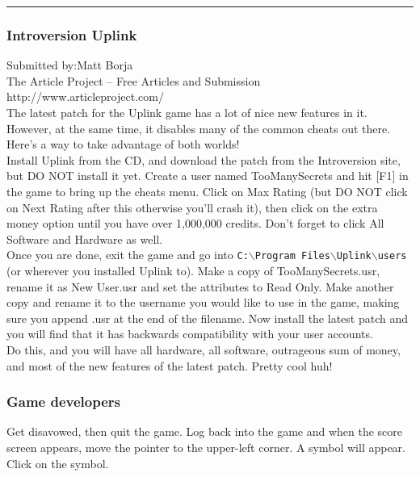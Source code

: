 \documentclass[11pt,twoside,a4paper]{book}
\begin{document}
\begin{center} \rule{0.85\textwidth}{0.01cm} \end{center}

\subsubsection{Introversion Uplink}

Submitted by:Matt Borja ~\\
The Article Project -- Free Articles and Submission ~\\
http://www.articleproject.com/ ~\\

The latest patch for the Uplink game has a lot of nice new features in it. However, at the same time, it disables many of the common cheats out there. Here's a way to take advantage of both worlds! ~\\

Install Uplink from the CD, and download the patch from the Introversion site, but DO NOT install it yet. Create a user named TooManySecrets and hit [F1] in the game to bring up the cheats menu. Click on Max Rating (but DO NOT click on Next Rating after this otherwise you'll crash it), then click on the extra money option until you have over 1,000,000 credits. Don't forget to click All Software and Hardware as well. ~\\

Once you are done, exit the game and go into \texttt{C:$\backslash$Program Files$\backslash$Uplink$\backslash$users} (or wherever you installed Uplink to). Make a copy of TooManySecrets.usr, rename it as New User.usr and set the attributes to Read Only. Make another copy and rename it to the username you would like to use in the game, making sure you append .usr at the end of the filename. Now install the latest patch and you will find that it has backwards compatibility with your user accounts. ~\\

Do this, and you will have all hardware, all software, outrageous sum of money, and most of the new features of the latest patch. Pretty cool huh! ~\\

\clearpage

\subsubsection{Game developers}

Get disavowed, then quit the game. Log back into the game and when the score screen appears, move the pointer to the upper-left corner. A symbol will appear. Click on the symbol. 
\end{document}
